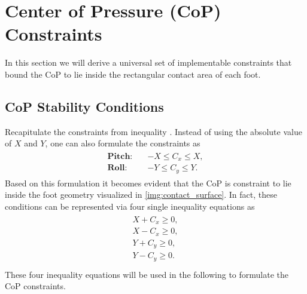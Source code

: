 \section{Center of Pressure (CoP) Constraints}\label{sec:StabilityCoP}
In this section we will derive a universal set of implementable constraints that bound the \gls{CoP} to lie inside the rectangular contact area of each foot.

\subsection{CoP Stability Conditions}
Recapitulate the constraints from inequality . Instead of using the absolute value of $X$ and $Y$, one can also formulate the constraints as
\begin{align}
\begin{split}
\textbf{Pitch}:\quad& -X \leq C_x \leq X,\\
\textbf{Roll}:\quad& -Y \leq C_y \leq Y.
\end{split}
\end{align}
Based on this formulation it becomes evident that the \gls{CoP} is constraint to lie inside the foot geometry visualized in \cref{img:contact_surface}. In fact, these conditions can be represented via four single inequality equations as
\begin{align}\label{eqn:CoPInequalities}
\begin{split}
X + C_x \geq 0, \\
X - C_x \geq 0, \\
Y + C_y \geq 0, \\
Y - C_y \geq 0. \\
\end{split}
\end{align}
These four inequality equations will be used in the following to formulate the \gls{CoP} constraints.   

